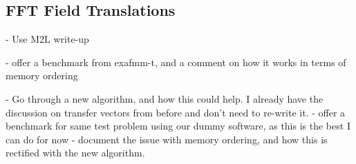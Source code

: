 \subsection{FFT Field Translations}

- Use M2L write-up

- offer a benchmark from exafmm-t, and a comment on how it works in terms of memory ordering

- Go through a new algorithm, and how this could help. I already have the discussion on transfer vectors from before and don't need to re-write it.
- offer a benchmark for same test problem using our dummy software, as this is the best I can do for now
- document the issue with memory ordering, and how this is rectified with the new algorithm.
